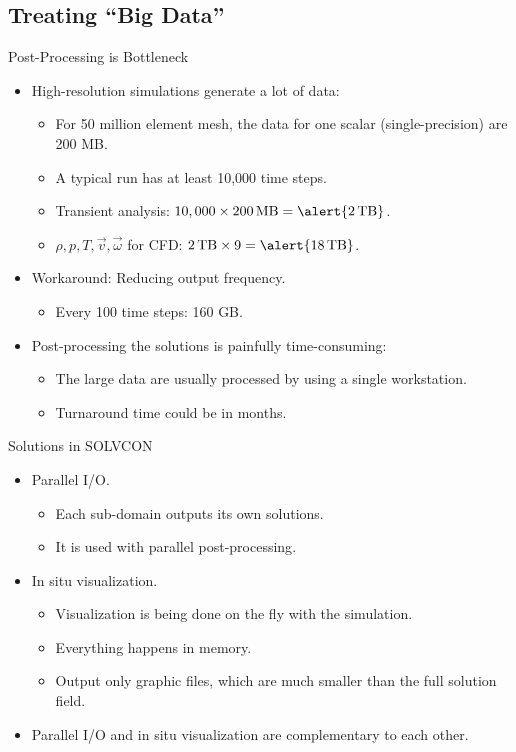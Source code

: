 \documentclass[dvips,xcolor=pst,14pt]{beamer}
\begin{document}
\subsection{
Treating ``Big Data''
}

\begin{frame}{
%
Post-Processing is Bottleneck
%
}
\begin{itemize}
  \item High-resolution simulations generate a lot of data:
  \begin{itemize}
    \item For 50 million element mesh, the data for one scalar
    (single-precision) are \alert{200 MB}.
    \item A typical run has at least 10,000 time steps.
    \item Transient analysis: $10,000 \times 200 \,\mbox{MB} = \alert{2
    \,\mbox{TB}}$.
    \item $\rho, p, T, \vec{v}, \vec{\omega}$ for CFD: $2 \,\mbox{TB} \times 9 =
    \alert{18 \,\mbox{TB}}$.
  \end{itemize}
  \item Workaround: Reducing output frequency.
  \begin{itemize}
    \item Every 100 time steps: \alert{160 GB}.
  \end{itemize}
  \item Post-processing the solutions is painfully time-consuming:
  \begin{itemize}
    \item The large data are usually processed by using a single workstation.
    \item Turnaround time could be in months.
  \end{itemize}
\end{itemize}
\end{frame}

\begin{frame}{
%
Solutions in SOLVCON
%
}
\begin{itemize}
  \item Parallel I/O.
  \begin{itemize}
    \item Each sub-domain outputs its own solutions.
    \item It is used with \alert{parallel post-processing}.
  \end{itemize}
  \item In situ visualization.
  \begin{itemize}
    \item Visualization is being done on the fly with the simulation.
    \item Everything happens in memory.
    \item Output only graphic files, which are much smaller than the full
    solution field.
  \end{itemize}
  \item Parallel I/O and in situ visualization are complementary to each other.
\end{itemize}
\end{frame}
\end{document}

